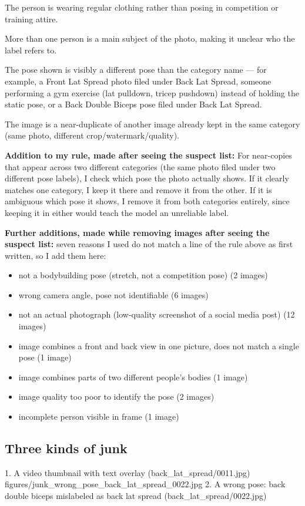 \documentclass[11pt]{article}
\begin{document}
The person is wearing regular clothing rather than posing in competition or training attire.

More than one person is a main subject of the photo, making it unclear who the label refers to.

The pose shown is visibly a different pose than the category name — for example, a Front Lat Spread photo filed under Back Lat Spread, someone performing a gym exercise (lat pulldown, tricep pushdown) instead of holding the static pose, or a Back Double Biceps pose filed under Back Lat Spread.

The image is a near-duplicate of another image already kept in the same category (same photo, different crop/watermark/quality).

\textbf{Addition to my rule, made after seeing the suspect list:} For near-copies that appear across two different categories (the same photo filed under two different pose labels), I check which pose the photo actually shows. If it clearly matches one category, I keep it there and remove it from the other. If it is ambiguous which pose it shows, I remove it from both categories entirely, since keeping it in either would teach the model an unreliable label.

\textbf{Further additions, made while removing images after seeing the suspect list:} seven reasons I used do not match a line of the rule above as first written, so I add them here:
\begin{itemize}
  \item not a bodybuilding pose (stretch, not a competition pose) (2 images)
  \item wrong camera angle, pose not identifiable (6 images)
  \item not an actual photograph (low-quality screenshot of a social media post) (12 images)
  \item image combines a front and back view in one picture, does not match a single pose (1 image)
  \item image combines parts of two different people's bodies (1 image)
  \item image quality too poor to identify the pose (2 images)
  \item incomplete person visible in frame (1 image)
\end{itemize}

\subsection*{Three kinds of junk}
           {1. A video thumbnail with text overlay (back\_lat\_spread/0011.jpg)}
           {figures/junk_wrong_pose_back_lat_spread_0022.jpg}
           {2. A wrong pose: back double biceps mislabeled as back lat spread
            (back\_lat\_spread/0022.jpg)}
\end{document}
